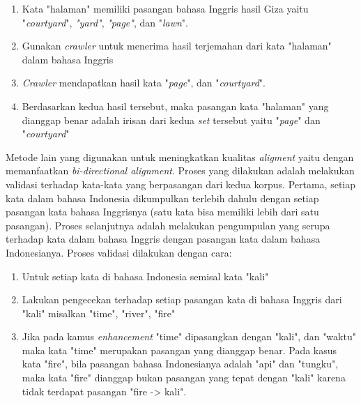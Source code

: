 \begin{enumerate}
	\item Kata "halaman" memiliki pasangan bahasa Inggris hasil Giza yaitu  "\textit{courtyard}", \textit{"yard"}, \textit{"page"}, dan "\textit{lawn}".
	\item Gunakan \textit{crawler} untuk menerima hasil terjemahan dari kata "halaman" dalam bahasa Inggris
	\item \textit{Crawler} mendapatkan hasil kata "\textit{page}", dan "\textit{courtyard}".
	\item Berdasarkan kedua hasil tersebut, maka pasangan kata "halaman" yang dianggap benar adalah irisan dari kedua \textit{set} tersebut yaitu "\textit{page}" dan "\textit{courtyard}"
\end{enumerate}

Metode lain yang digunakan untuk meningkatkan kualitas \textit{aligment} yaitu dengan memanfaatkan \textit{bi-directional alignment}. Proses yang dilakukan adalah melakukan validasi terhadap kata-kata yang berpasangan  dari kedua korpus. Pertama, setiap kata dalam bahasa Indonesia dikumpulkan terlebih dahulu dengan setiap pasangan kata bahasa Inggrisnya (satu kata bisa memiliki lebih dari satu pasangan). Proses selanjutnya adalah melakukan pengumpulan yang serupa terhadap kata dalam bahasa Inggris dengan pasangan kata dalam bahasa Indonesianya. Proses validasi dilakukan dengan cara:

\begin{enumerate}
	\item Untuk setiap kata di bahasa Indonesia semisal kata "kali"
	\item Lakukan pengecekan terhadap setiap pasangan kata di bahasa Inggris dari "kali" misalkan "time", "river", "fire"
	\item Jika pada kamus \textit{enhancement} "time" dipasangkan dengan "kali", dan "waktu" maka kata "time" merupakan pasangan yang dianggap benar. Pada kasus kata "fire", bila pasangan bahasa Indonesianya adalah "api" dan "tungku", maka kata "fire" dianggap bukan pasangan yang tepat dengan "kali" karena tidak terdapat pasangan "fire -> kali".
\end{enumerate} 

